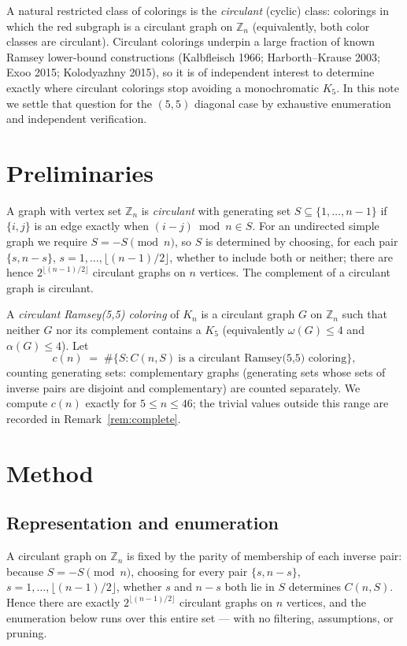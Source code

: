 \documentclass[11pt]{article}
\theoremstyle{remark}
\begin{document}
A natural restricted class of colorings is the \emph{circulant} (cyclic) class: colorings in
which the red subgraph is a circulant graph on $\mathbb{Z}_n$ (equivalently, both color
classes are circulant). Circulant colorings underpin a large fraction of known Ramsey
lower-bound constructions (Kalbfleisch 1966; Harborth--Krause 2003; Exoo 2015;
Kolodyazhny 2015), so it is of independent interest to determine exactly where circulant
colorings stop avoiding a monochromatic $K_5$. In this note we settle that question for the
$(5,5)$ diagonal case by exhaustive enumeration and independent verification.

\section{Preliminaries}\label{sec:prelim}
A graph with vertex set $\mathbb{Z}_n$ is \emph{circulant} with generating set
$S\subseteq\{1,\dots,n-1\}$ if $\{i,j\}$ is an edge exactly when $(i-j)\bmod n\in S$. For an
undirected simple graph we require $S=-S\pmod n$, so $S$ is determined by choosing, for each
pair $\{s,n-s\}$, $s=1,\dots,\lfloor(n-1)/2\rfloor$, whether to include both or neither;
there are hence $2^{\lfloor(n-1)/2\rfloor}$ circulant graphs on $n$ vertices. The complement
of a circulant graph is circulant.

A \emph{circulant Ramsey(5,5) coloring} of $K_n$ is a circulant graph $G$ on $\mathbb{Z}_n$
such that neither $G$ nor its complement contains a $K_5$ (equivalently $\omega(G)\le4$ and
$\alpha(G)\le4$). Let
\[
c(n)\;=\;\#\{S : C(n,S)\ \text{is a circulant Ramsey(5,5) coloring}\},
\]
counting generating sets: complementary graphs (generating sets whose sets of inverse
pairs are disjoint and complementary) are counted separately. We compute $c(n)$ exactly
for $5\le n\le 46$; the trivial values outside this range are recorded in
Remark~\ref{rem:complete}.

\section{Method}\label{sec:method}

\subsection{Representation and enumeration}\label{sec:repr}
A circulant graph on $\mathbb{Z}_n$ is fixed by the parity of membership of each inverse
pair: because $S=-S\pmod n$, choosing for every pair $\{s,n-s\}$, $s=1,\dots,\lfloor(n-1)/2\rfloor$,
whether $s$ and $n-s$ both lie in $S$ determines $C(n,S)$. Hence there are exactly
$2^{\lfloor(n-1)/2\rfloor}$ circulant graphs on $n$ vertices, and the enumeration below
runs over this entire set --- with no filtering, assumptions, or pruning.
\end{document}

